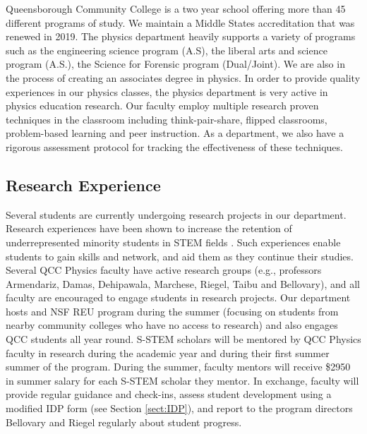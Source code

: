 \documentclass[12pt]{article}
\newcommand\new[1]{{\color{blue}#1}}
\begin{document}

Queensborough Community College is a two year school offering more than 45 different programs of study.  We maintain a Middle States accreditation that was renewed in 2019.  The physics department heavily supports a variety of programs such as the engineering science program (A.S), the liberal arts and science program (A.S.), the Science for Forensic program (Dual/Joint).  We are also in the process of creating an associates degree in physics.  In order to provide quality experiences in our physics classes, the physics department is very active in physics education research.  Our faculty employ multiple research proven techniques in the classroom including think-pair-share, flipped classrooms, problem-based learning and peer instruction. As a department, we also have a rigorous assessment protocol for tracking the effectiveness of these techniques.
\subsection{Research Experience}
Several students are currently undergoing research projects in our department.  Research experiences have been shown to increase the retention of underrepresented minority students in STEM fields \citep{Graham,Russell}.   Such experiences  enable students to gain skills and network, and aid them as they continue their studies.  Several QCC Physics faculty have active research groups (e.g., professors Armendariz, Damas, Dehipawala, Marchese, Riegel, Taibu and Bellovary), and all faculty are encouraged to engage students in research projects.  Our department hosts and NSF REU program during the summer (focusing on students from nearby community colleges who have no access to research) and also engages QCC students all year round.  S-STEM scholars will be mentored by QCC Physics faculty in research during the academic year and during their first summer summer of the program.  During the summer, faculty mentors will receive \$2950 in summer salary for each S-STEM scholar they mentor.  In exchange, faculty will provide regular guidance and check-ins, assess student development using a modified IDP form (see Section \ref{sect:IDP}), and report to the program directors Bellovary and Riegel regularly about student progress.  
\end{document}
